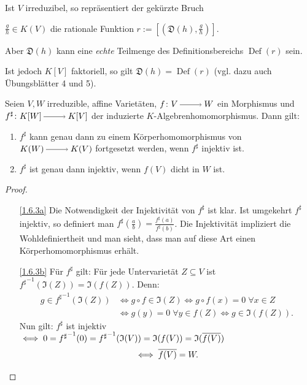 \documentclass[a4paper,12pt,index=toc]{scrbook}
\theoremstyle{keinenummern} %
\def\I{\mathfrak{I}}
\newcommand{\D}{\mathfrak{D}}
\newcommand{\Def}{\operatorname{Def}}
\def\Bar#1{\ensuremath\overline{#1}}
\begin{document}
\begin{w}
Ist $V$ irreduzibel, so repräsentiert der gekürzte Bruch\par $\frac{g}{h} \in K(V)$ die rationale Funktion $r:=[(\D(h),\frac{g}{h})]$.

Aber $\D(h)$ kann eine \textit{echte} Teilmenge des Definitionsbereichs $\Def(r)$ sein. 

Ist jedoch $K[V]$ faktoriell, so gilt $\D(h)=\Def(r)$ (vgl. dazu auch Übungsblätter 4 und 5).
\end{w}

\begin{prop}\label{1.6.3}
Seien $V,W$ irreduzible, affine Varietäten, $f \colon V\ra W$ ein Morphismus und $f^{\sharp} \colon K[W]\ra K[V]$ der induzierte $K$-Algebrenhomomorphismus. Dann gilt:
  \begin{enumerate}
  \item{} $f^{\sharp}$ kann genau dann zu einem Körperhomomorphismus von $K(W)\ra K(V)$ fortgesetzt werden, wenn $f^{\sharp}$ injektiv ist.
  \item{} $f^{\sharp}$ ist genau dann injektiv, wenn $f(V)$ dicht in $W$ ist.
  \end{enumerate}
\end{prop}

\begin{proof}
  \begin{enumerate}
  \item[\ref{1.6.3a}] Die Notwendigkeit der Injektivität von $f^{\sharp}$ ist klar. Ist umgekehrt $f^{\sharp}$ injektiv, so definiert man $f^{\sharp}(\frac{a}{b})=\frac{f^{\sharp}(a)}{f^{\sharp}(b)}$. Die Injektivität impliziert die Wohldefiniertheit und man sieht, dass man auf diese Art einen     Körperhomomorphismus erhält.
  \item[\ref{1.6.3b}]  Für $f^{\sharp}$ gilt: Für jede Untervarietät $Z \subseteq V$ ist ${f^{\sharp}}^{-1}(\I(Z))=\I(f(Z))$. Denn:
\begin{align*}g \in {f^{\sharp}}^{-1}(\I(Z))& \iff g\circ f \in \I(Z) \iff g \circ f(x)=0 \;\forall x \in Z\\
& \iff g(y)=0 \;\forall y \in f(Z)\iff g\in\I(f(Z)).\end{align*}
Nun gilt: $f^{\sharp}$ ist injektiv $\iff 0={f^{\sharp}}^{-1}(0)={f^{\sharp}}^{-1}(\I(V))=\I(f(V))=\I(\Bar{f(V)})$
\begin{equation*} \iff \Bar{f(V)}=W.\end{equation*}
  \end{enumerate}
\end{proof}
\end{document}
